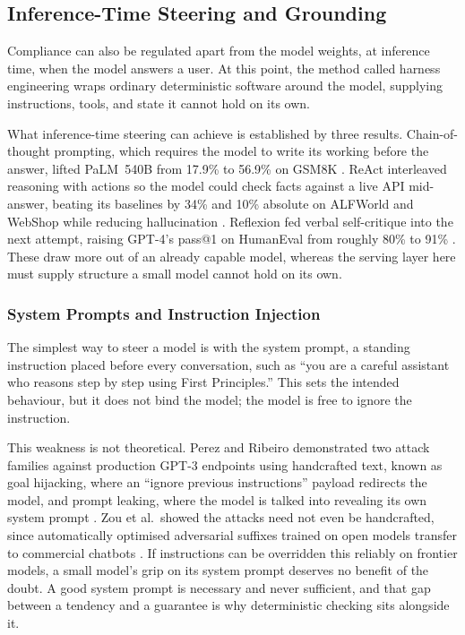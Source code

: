 \subsection{Inference-Time Steering and Grounding}
\label{sec:inference-time-steering}

Compliance can also be regulated apart from the model weights, at inference time, when the model answers a user. At this point, the method called harness engineering wraps ordinary deterministic software around the model, supplying instructions, tools, and state it cannot hold on its own. 

What inference-time steering can achieve is established by three results. Chain-of-thought prompting, which requires the model to write its working before the answer, lifted PaLM~540B from 17.9\% to 56.9\% on GSM8K \cite{wei2023chainofthoughtpromptingelicitsreasoning}. ReAct interleaved reasoning with actions so the model could check facts against a live API mid-answer, beating its baselines by 34\% and 10\% absolute on ALFWorld and WebShop while reducing hallucination \cite{yao2023reactsynergizingreasoningacting}. Reflexion fed verbal self-critique into the next attempt, raising GPT-4's pass@1 on HumanEval from roughly 80\% to 91\% \cite{shinn2023reflexionlanguageagentsverbal}. These draw more out of an already capable model, whereas the serving layer here must supply structure a small model cannot hold on its own.

\subsubsection{System Prompts and Instruction Injection}
\label{subsec:system-prompts-and-instruction-injection}

The simplest way to steer a model is with the system prompt, a standing instruction placed before every conversation, such as ``you are a careful assistant who reasons step by step using First Principles.'' This sets the intended behaviour, but it does not bind the model; the model is free to ignore the instruction.

This weakness is not theoretical. Perez and Ribeiro demonstrated two attack families against production GPT-3 endpoints using handcrafted text, known as goal hijacking, where an ``ignore previous instructions'' payload redirects the model, and prompt leaking, where the model is talked into revealing its own system prompt \cite{perez2022ignorepreviouspromptattack}. Zou et al.\ showed the attacks need not even be handcrafted, since automatically optimised adversarial suffixes trained on open models transfer to commercial chatbots \cite{zou2023universaltransferableadversarialattacks}. If instructions can be overridden this reliably on frontier models, a small model's grip on its system prompt deserves no benefit of the doubt. A good system prompt is necessary and never sufficient, and that gap between a tendency and a guarantee is why deterministic checking sits alongside it.

